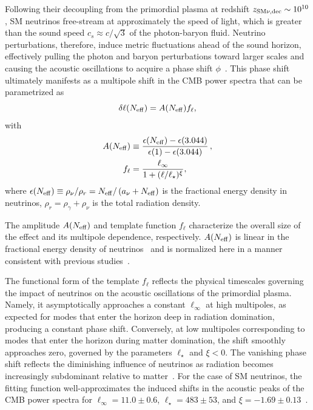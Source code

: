 \noindent Following their decoupling from the primordial plasma at redshift $z_{\rm SM\nu,\rm{dec}}\sim 10^{10}$, SM neutrinos free-stream at approximately the speed of light, which is greater than the sound speed $c_s\approx c/\sqrt{3}$ of the photon-baryon fluid.
Neutrino perturbations, therefore, induce metric fluctuations ahead of the sound horizon, effectively pulling the photon and baryon perturbations toward larger scales and causing the acoustic oscillations to acquire a phase shift $\phi$~\cite{Bashinsky:2003tk,Baumann:2015rya}.  This phase shift ultimately manifests as a multipole shift in the CMB power spectra that can be parametrized as~\cite{Follin:2015hya, Montefalcone:2025unv}
\begin{equation}
    \delta\ell(N_{\rm eff})= A(N_{\rm eff}) f_{\rm\ell},\label{eq:ch13-delta_ell}
\end{equation}
with
\begin{align}
    A(N_\mathrm{eff}) &\equiv \frac{\epsilon(N_\mathrm{eff})-\epsilon(3.044)}{\epsilon(1)-\epsilon(3.044)}\, ,	\label{eq:ch13-ANeff} \\
    f_\ell &= \frac{\ell_{\rm \infty}}{1+(\ell/\ell_\star)^\xi},\label{eq:ch13-fell}
\end{align}
where $\epsilon(N_{\rm eff})\equiv \rho_\nu/\rho_r=N_{\rm eff}/\left(a_\nu +N_{\rm eff}\right)$ is the fractional energy density in neutrinos, $\rho_r=\rho_\gamma+\rho_\nu$ is the total radiation density.

The amplitude $A(N_\mathrm{eff})$ and template function $f_\ell$ characterize the overall size of the effect and its multipole dependence, respectively. $A(N_{\rm eff})$ is linear in the fractional energy density of neutrinos~\cite{Bashinsky:2003tk, Baumann:2015rya} and is normalized here in a manner consistent with previous studies~\cite{Follin:2015hya, Montefalcone:2025unv}.

The functional form of the template $f_\ell$ reflects the physical timescales governing the impact of neutrinos on the acoustic oscillations of the primordial plasma. Namely, it asymptotically approaches a constant $\ell_\infty$ at high multipoles, as expected for modes that enter the horizon deep in radiation domination, producing a constant phase shift.  Conversely, at low multipoles corresponding to modes that enter the horizon during matter domination, the shift smoothly approaches zero, governed by the parameters $\ell_\star$ and $\xi<0$. The vanishing phase shift reflects the diminishing influence of neutrinos as radiation becomes increasingly subdominant relative to matter~\cite{Baumann:2015rya}. For the case of SM neutrinos, the fitting function well-approximates the induced shifts in the acoustic peaks of the CMB power spectra for $\ell_\infty = 11.0 \pm 0.6$, $\ell_\star = 483 \pm 53$, and $\xi = -1.69 \pm 0.13$~\cite{Montefalcone:2025unv}.


